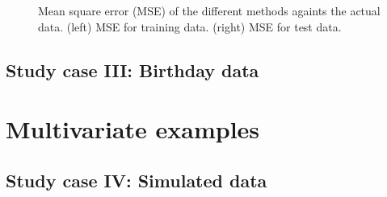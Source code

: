 \documentclass[]{interact}
\theoremstyle{plain}%
\theoremstyle{definition}
\theoremstyle{remark}
\begin{document}
\begin{figure}
\caption{Mean square error (MSE) of the different methods againts the actual data. (left) MSE for training data. (right) MSE for test data.}
  \label{fig14_MSE_train_gaydata}
\end{figure}



\subsection{Study case III: Birthday data}

\vspace{5mm}
\section{Multivariate examples}
\subsection{Study case IV: Simulated data}
\end{document}
